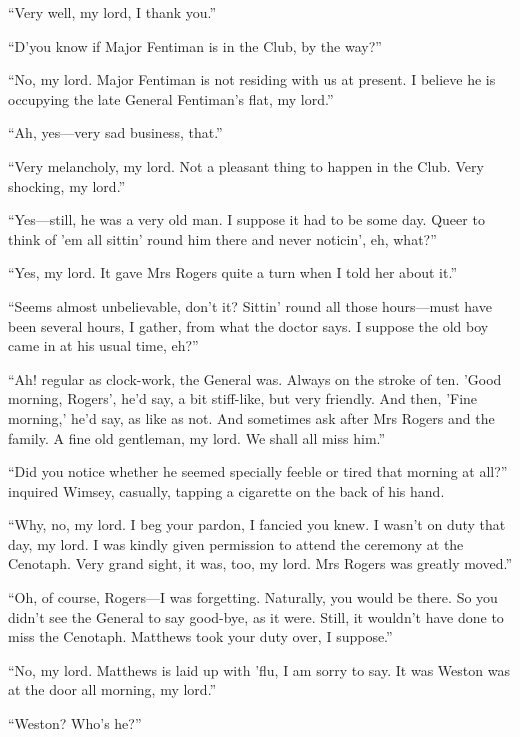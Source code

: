 \enquote{Very well, my lord, I thank you.}

\enquote{D'you know if Major Fentiman is in the Club, by the way?}

\enquote{No, my lord. Major Fentiman is not residing with us at present. I believe he is occupying the late General Fentiman's flat, my lord.}

\enquote{Ah, yes\allowbreak---\allowbreak very sad business, that.}

\enquote{Very melancholy, my lord. Not a pleasant thing to happen in the Club. Very shocking, my lord.}

\enquote{Yes\allowbreak---\allowbreak still, he was a very old man. I suppose it had to be some day. Queer to think of 'em all sittin' round him there and never noticin', eh, what?}

\enquote{Yes, my lord. It gave Mrs Rogers quite a turn when I told her about it.}

\enquote{Seems almost unbelievable, don't it? Sittin' round all those hours\allowbreak---\allowbreak must have been several hours, I gather, from what the doctor says. I suppose the old boy came in at his usual time, eh?}

\enquote{Ah! regular as clock-work, the General was. Always on the stroke of ten. 'Good morning, Rogers', he'd say, a bit stiff-like, but very friendly. And then, 'Fine morning,' he'd say, as like as not. And sometimes ask after Mrs Rogers and the family. A fine old gentleman, my lord. We shall all miss him.}

\enquote{Did you notice whether he seemed specially feeble or tired that morning at all?} inquired Wimsey, casually, tapping a cigarette on the back of his hand.

\enquote{Why, no, my lord. I beg your pardon, I fancied you knew. I wasn't on duty that day, my lord. I was kindly given permission to attend the ceremony at the Cenotaph. Very grand sight, it was, too, my lord. Mrs Rogers was greatly moved.}

\enquote{Oh, of course, Rogers\allowbreak---\allowbreak I was forgetting. Naturally, you would be there. So you didn't see the General to say good-bye, as it were. Still, it wouldn't have done to miss the Cenotaph. Matthews took your duty over, I suppose.}

\enquote{No, my lord. Matthews is laid up with 'flu, I am sorry to say. It was Weston was at the door all morning, my lord.}

\enquote{Weston? Who's he?}

